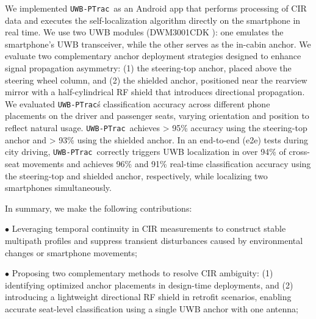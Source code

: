 \documentclass[sigconf]{acmart}
\newcommand{\name}{{{\tt UWB-PTrac}}}
\begin{document}
We implemented \name\ as an Android app that performs processing of CIR data and executes the self-localization algorithm directly on the smartphone in real time. We use two UWB modules (DWM3001CDK \cite{Dw3000}): one emulates the smartphone’s UWB transceiver, while the other serves as the in-cabin anchor. 
We evaluate two complementary anchor deployment strategies designed to enhance signal propagation asymmetry: (1) the steering-top anchor, placed above the steering wheel column, and (2) the shielded anchor, positioned near the rearview mirror with a half-cylindrical RF shield that introduces directional propagation.
We evaluated \name\'s classification accuracy across different phone placements on the driver and passenger seats, varying orientation and position to reflect natural usage. 
\name\ achieves > 95\% accuracy using the steering-top anchor and > 93\% using the shielded anchor. In an end-to-end (e2e) tests during city driving,  \name\ correctly triggers UWB localization in over 94\% of cross-seat movements and achieves 96\% and 91\% real-time classification accuracy using the steering-top and shielded anchor, respectively, while localizing two smartphones simultaneously.


%

In summary, we make the following contributions:

$\bullet$ Leveraging temporal continuity in CIR measurements to construct 
stable multipath profiles and suppress transient disturbances caused by 
environmental changes or smartphone movements;

$\bullet$ Proposing two complementary methods to resolve CIR ambiguity:
(1) identifying optimized anchor placements in design-time deployments, and
(2) introducing a lightweight directional RF shield in retrofit scenarios,
enabling accurate seat-level classification using a single UWB anchor with one antenna;
\end{document}
